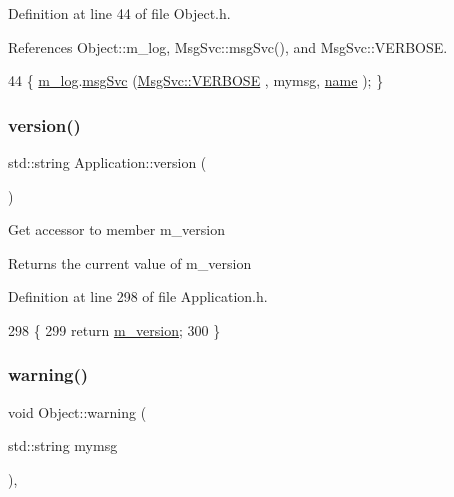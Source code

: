 Definition at line 44 of file Object.\+h.



References Object\+::m\+\_\+log, Msg\+Svc\+::msg\+Svc(), and Msg\+Svc\+::\+V\+E\+R\+B\+O\+SE.


\begin{DoxyCode}
44 \{ \hyperlink{classObject_a0d269813dd7ac1f24bc143031e2963f2}{m\_log}.\hyperlink{classMsgSvc_ad25f18047920cc59a314e5098259711c}{msgSvc} (\hyperlink{classMsgSvc_ae671eb7301996cd049d2da8a65925926af655256b06494ade5ba830abe5401ec9}{MsgSvc::VERBOSE} , mymsg, \hyperlink{classObject_a300f4c05dd468c7bb8b3c968868443c1}{name} ); \}
\end{DoxyCode}
\mbox{\label{classApplication_a060ac7b6d3a6cb111a9ed39bfd0350d1}} 
\subsubsection{\texorpdfstring{version()}{version()}}
{\footnotesize\ttfamily std\+::string Application\+::version (\begin{DoxyParamCaption}{ }\end{DoxyParamCaption})\hspace{0.3cm}{\ttfamily [inline]}}

Get accessor to member m\+\_\+version \begin{DoxyReturn}{Returns}
the current value of m\+\_\+version 
\end{DoxyReturn}


Definition at line 298 of file Application.\+h.


\begin{DoxyCode}
298                        \{
299     \textcolor{keywordflow}{return} \hyperlink{classApplication_acbbdbd17a3a66782c54dbbe58a9ca8d8}{m\_version};
300   \}
\end{DoxyCode}
\mbox{\label{classObject_a65cd4fda577711660821fd2cd5a3b4c9}} 
\subsubsection{\texorpdfstring{warning()}{warning()}\hspace{0.1cm}{\footnotesize\ttfamily [1/2]}}
{\footnotesize\ttfamily void Object\+::warning (\begin{DoxyParamCaption}\item[{std\+::string}]{mymsg }\end{DoxyParamCaption})\hspace{0.3cm}{\ttfamily [inline]}, {\ttfamily [inherited]}}



